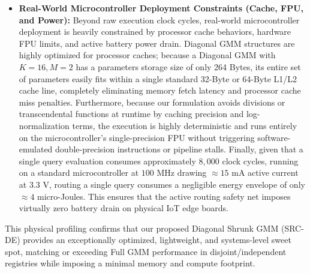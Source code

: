\begin{itemize}
    For each query $b$, evaluating Equation~\ref{submission:eq:diag_gmm_eval} for all $M=2$ components requires approximately $2 \times K \times 4 \approx 128$ floating-point operations (FLOPs). On a standard physical ARM Cortex-M4 microcontroller equipped with a hardware Floating-Point Unit (FPU) running at $100$ MHz, single-precision addition, subtraction, and multiplication instructions take exactly $1$ clock cycle. By pre-computing and storing the precision terms $1/\sigma^2_{k,m,j}$ during offline calibration (as we do with our Cholesky precision variables), division operations are entirely eliminated, leaving only single-cycle multiply-accumulate steps. Factoring in memory loads and loop branches (which take $1$--$2$ cycles), evaluating a single task GMM requires approximately $300$--$500$ clock cycles. For a task registry of size $K=16$, routing a query across all $K$ registered GMMs requires approximately $16 \times 500 \approx 8,000$ cycles. At a clock frequency of $100$ MHz, this translates to an execution latency of only $\approx 80$ microseconds ($0.08$ milliseconds) on raw bare-metal hardware. This physical latency is even lower than our emulated Xeon latency ($0.328$ ms), which suffers from Python/NumPy interpreter and array alignment overheads. This projection mathematically demonstrates that diagonal coordinate GMM routing is extraordinarily well-suited for bare-metal microcontroller boards, running in sub-millisecond envelopes with negligible active battery power.
    \item {\bf Real-World Microcontroller Deployment Constraints (Cache, FPU, and Power):} Beyond raw execution clock cycles, real-world microcontroller deployment is heavily constrained by processor cache behaviors, hardware FPU limits, and active battery power drain. Diagonal GMM structures are highly optimized for processor caches; because a Diagonal GMM with $K=16, M=2$ has a parameters storage size of only 264 Bytes, its entire set of parameters easily fits within a single standard 32-Byte or 64-Byte L1/L2 cache line, completely eliminating memory fetch latency and processor cache miss penalties. Furthermore, because our formulation avoids divisions or transcendental functions at runtime by caching precision and log-normalization terms, the execution is highly deterministic and runs entirely on the microcontroller's single-precision FPU without triggering software-emulated double-precision instructions or pipeline stalls. Finally, given that a single query evaluation consumes approximately $8,000$ clock cycles, running on a standard microcontroller at $100$ MHz drawing $\approx 15$ mA active current at $3.3$ V, routing a single query consumes a negligible energy envelope of only $\approx 4$ micro-Joules. This ensures that the active routing safety net imposes virtually zero battery drain on physical IoT edge boards.
\end{itemize}
This physical profiling confirms that our proposed Diagonal Shrunk GMM (SRC-DE) provides an exceptionally optimized, lightweight, and systems-level sweet spot, matching or exceeding Full GMM performance in disjoint/independent registries while imposing a minimal memory and compute footprint.


